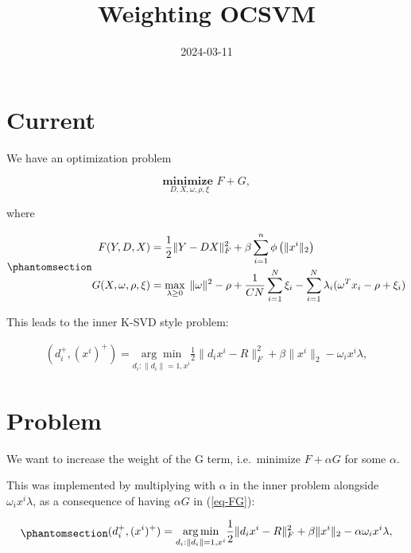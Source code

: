\documentclass[
  letterpaper,
  DIV=11,
  numbers=noendperiod]{scrartcl}
\title{Weighting OCSVM}
\author{}
\date{2024-03-11}
\renewcommand*\contentsname{Table of contents}
\newcommand\contentsname{Table of contents}
\begin{document}
\maketitle

\renewcommand*\contentsname{Table of contents}
{
\hypersetup{linkcolor=}
\setcounter{tocdepth}{3}
\tableofcontents
}
\section{Current}\label{current}

We have an optimization problem

\[\underset{D, X, \omega, \rho, \xi}{\textbf{minimize  }} F + G,\]

where

\begin{equation}\phantomsection\label{eq-FG}{
\begin{align}
F(Y, D, X)  &= \frac12 \|Y - DX\|_F^2
  + \beta \sum_{i=1}^{n} \phi\left(\|x^i\|_2\right)  \\
G(X, \omega, \rho, \xi) &=\max\limits_{\lambda \ge 0} \; \|\omega\|^2 - \rho + \frac{1}{CN} \sum_{i=1}^{N} \xi_i
- \sum_{i=1}^{N} \lambda_i (\omega^T x_i - \rho + \xi_i)
\end{align}
}\end{equation}

This leads to the inner K-SVD style problem:

\[
\begin{align}
(d^+_i,(x^i)^+) = \underset{d_i: \|d_i\|=1,x^i}{\arg\min} \frac12\|d_ix^i - R\|_F^2  + \beta\|x^i\|_2 - \omega_i x^i\lambda ,
\end{align}
\]

\section{Problem}\label{problem}

We want to increase the weight of the G term, i.e.~minimize
\(F + \alpha G\) for some \(\alpha\).

This was implemented by multiplying with \(\alpha\) in the inner problem
alongside \(\omega_i x^i \lambda\), as a consequence of having
\(\alpha G\) in (\ref{eq-FG}):

\begin{equation}\phantomsection\label{eq-inner}{
\begin{align}
(d^+_i,(x^i)^+) = \underset{d_i: \|d_i\|=1,x^i}{\arg\min} \frac12\|d_ix^i - R\|_F^2  + \beta\|x^i\|_2 - \alpha \omega_i x^i\lambda ,
\end{align}
}\end{equation}
\end{document}

